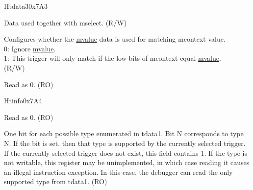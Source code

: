 \begin{register}{H}{tdata3}{0x7A3}\label{regdesc:TDATA3}
%
%
%
\regnewline%
\begin{regdesc}\begin{reglist}
\label{fielddesc:MVALUE}\item [mvalue] Data used together with mselect. (R/W)
\label{fielddesc:MSELECT}\item [mselect] Configures whether the \hyperref[fielddesc:MVALUE]{mvalue} data is used for matching mcontext value.\\
0: Ignore \hyperref[fielddesc:MVALUE]{mvalue}. \\
1: This trigger will only match if the low bits of mcontext equal \hyperref[fielddesc:MVALUE]{mvalue}. \\
(R/W)
\label{fielddesc:tdata3_rsvd}\item [Reserved] Read as 0. (RO)
\end{reglist}\end{regdesc}
\end{register}

\begin{register}{H}{tinfo}{0x7A4}\label{regdesc:TINFO}
%
%
\regnewline%
\begin{regdesc}\begin{reglist}
\label{fielddesc:tinfo_rsvd}\item [Reserved] Read as 0. (RO)
\label{fielddesc:INFO}\item [info] One bit for each possible type enumerated in tdata1. Bit N corresponds to type N. If the bit is set, then that type is supported by the currently selected trigger. If the currently selected trigger does not exist, this field contains 1. If the type is not writable, this register may be unimplemented, in which case reading it causes an illegal instruction exception. In this case, the debugger can read the only supported type from tdata1. (RO)
\end{reglist}\end{regdesc}
\end{register}

